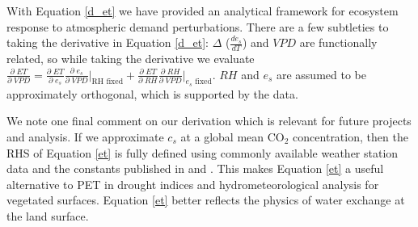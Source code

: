 \documentclass[draft,linenumbers]{agujournal}
\begin{document}
With Equation \ref{d_et} we have provided an analytical framework for ecosystem response to atmospheric demand perturbations. There are a few subtleties to taking the derivative in Equation \ref{d_et}: $\Delta$ ($\frac{d e_{s}}{d T}$) and $VPD$ are functionally related, so while taking the derivative we evaluate $\frac{\partial \; ET}{\partial \; VPD} = \frac{\partial \; ET} {\partial \; e_s} \frac{\partial \; e_s}{\partial \; VPD} \Big|_{\text{RH fixed}} + \frac{\partial \; ET}{\partial \; RH} \frac{\partial \; RH}{\partial \; VPD} \Big|_{\text{$e_s$ fixed}}$. $RH$ and $e_s$ are assumed to be approximately orthogonal, which is supported by the data. 

We note one final comment on our derivation which is relevant for future projects and analysis. If we approximate $c_s$ at a global mean CO$_2$ concentration, then the RHS of Equation \ref{et} is fully defined using commonly available weather station data and the constants published in \citet{Zhou_2015} and \citet{Lin_2015}. This makes Equation \ref{et} a useful alternative to PET in drought indices and hydrometeorological analysis for vegetated surfaces. Equation \ref{et} better reflects the physics of water exchange at the land surface. 
\end{document}
